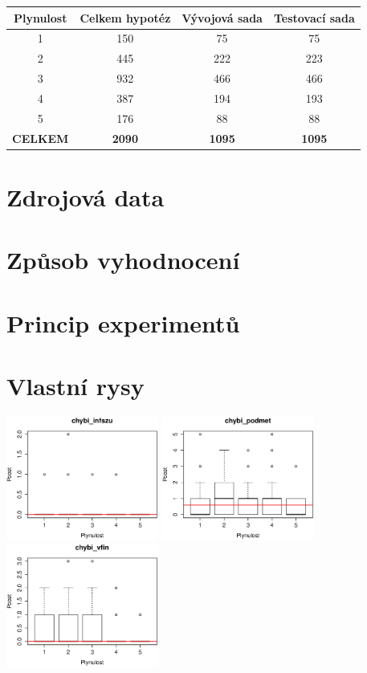 \documentclass[12pt,a4paper]{report}
\begin{document}
\begin{center}\begin{tabular}{|c|c|c|c|}
	\hline
	\textbf{Plynulost} & \textbf{Celkem hypotéz} & \textbf{Vývojová sada} & \textbf{Testovací sada}\\
	\hline
	1 & 150 & 75 & 75\\
	\hline
	2 & 445 & 222 & 223\\
	\hline
	3 & 932 & 466 & 466\\
	\hline
	4 & 387 & 194 & 193\\
	\hline
	5 & 176 & 88 & 88\\
	\hline
	\hline	
	\multicolumn{1}{c}{\textbf{CELKEM}} & \multicolumn{1}{c}{\textbf{2090}} & \multicolumn{1}{c}{\textbf{1095}} & \multicolumn{1}{c}{\textbf{1095}}\\
\end{tabular}\end{center}

\section{Zdrojová data}
\section{Způsob vyhodnocení}
\section{Princip experimentů}

\section{Vlastní rysy}
\includegraphics[width=50mm]{./grafy/rysy/chybi_infszu.eps}
\includegraphics[width=50mm]{./grafy/rysy/chybi_podmet.eps}
\includegraphics[width=50mm]{./grafy/rysy/chybi_vfin.eps}
\end{document}
